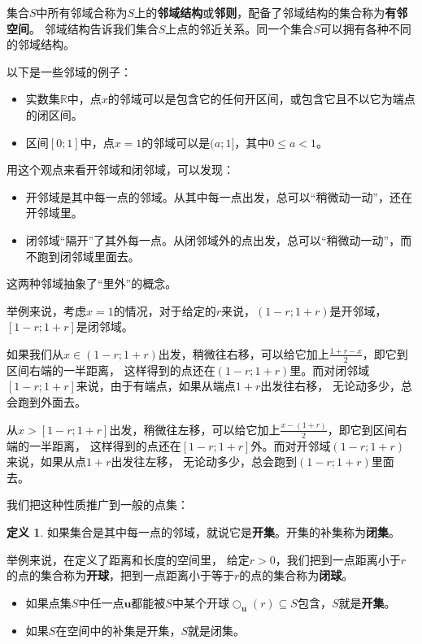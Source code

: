 \documentclass[12pt,UTF8]{ctexbook}
\theoremstyle{definition}
\newtheorem{df}{定义}[section]
\theoremstyle{plain}
\begin{document}
集合$S$中所有邻域合称为$S$上的\textbf{邻域结构}或\textbf{邻则}，配备了邻域结构的集合称为\textbf{有邻空间}。
邻域结构告诉我们集合$S$上点的邻近关系。同一个集合$S$可以拥有各种不同的邻域结构。

以下是一些邻域的例子：
\begin{itemize}
    \item 实数集$\mathbb{R}$中，点$x$的邻域可以是包含它的任何开区间，或包含它且不以它为端点的闭区间。
    \item 区间$[0;1]$中，点$x=1$的邻域可以是$(a;1]$，其中$0\leqslant a < 1$。
\end{itemize}

用这个观点来看开邻域和闭邻域，可以发现：
\begin{itemize}
    \item 开邻域是其中每一点的邻域。从其中每一点出发，总可以“稍微动一动”，还在开邻域里。
    \item 闭邻域“隔开”了其外每一点。从闭邻域外的点出发，总可以“稍微动一动”，而不跑到闭邻域里面去。
\end{itemize}
这两种邻域抽象了“里外”的概念。

举例来说，考虑$x=1$的情况，对于给定的$r$来说，$(1-r;1+r)$是开邻域，$[1-r;1+r]$是闭邻域。

如果我们从$x\in(1-r;1+r)$出发，稍微往右移，可以给它加上$\frac{1+r-x}{2}$，即它到区间右端的一半距离，
这样得到的点还在$(1-r;1+r)$里。而对闭邻域$[1-r;1+r]$来说，由于有端点，如果从端点$1+r$出发往右移，
无论动多少，总会跑到外面去。

从$x>[1-r;1+r]$出发，稍微往左移，可以给它加上$\frac{x-(1+r)}{2}$，即它到区间右端的一半距离，
这样得到的点还在$[1-r;1+r]$外。而对开邻域$(1-r;1+r)$来说，如果从点$1+r$出发往左移，
无论动多少，总会跑到$(1-r;1+r)$里面去。

我们把这种性质推广到一般的点集：
\begin{df}
    如果集合是其中每一点的邻域，就说它是\textbf{开集}。开集的补集称为\textbf{闭集}。
\end{df}

举例来说，在定义了距离和长度的空间里，
给定$r>0$，我们把到一点距离小于$r$的点的集合称为\textbf{开球}，把到一点距离小于等于$r$的点的集合称为\textbf{闭球}。
\begin{itemize}
    \item 如果点集$S$中任一点$\mathbf{u}$都能被$S$中某个开球$\bigcirc_{\mathbf{u}}(r)\subseteq S$包含，$S$就是\textbf{开集}。
    \item 如果$S$在空间中的补集是开集，$S$就是闭集。
\end{itemize}
\end{document}
